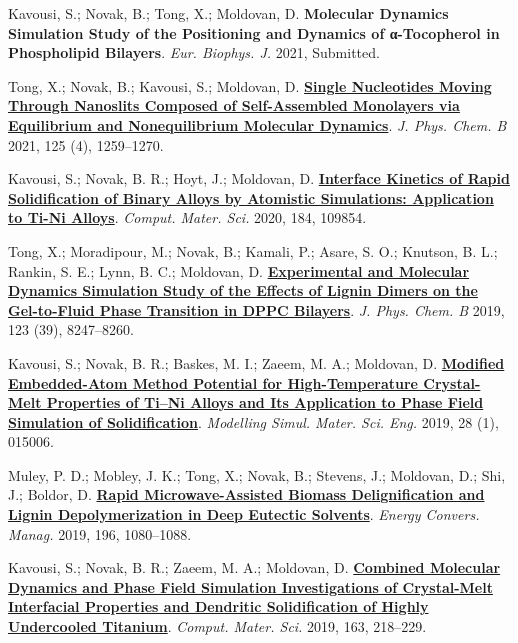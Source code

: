 \pagebreak


\begin{cventries}
  \cventry
    {} %
    {} %
    {} %
    {} %
    {
      \begin{cvitems} %
        \item {Kavousi, S.; Novak, B.; Tong, X.; Moldovan, D. \textbf{Molecular Dynamics Simulation Study of the Positioning and Dynamics of α-Tocopherol in Phospholipid Bilayers}. \textit{Eur. Biophys. J.} 2021, Submitted.}
        \item {Tong, X.; Novak, B.; Kavousi, S.; Moldovan, D. \href{https://doi.org/10.1021/acs.jpcb.0c07797}{\textbf{Single Nucleotides Moving Through Nanoslits Composed of Self-Assembled Monolayers via Equilibrium and Nonequilibrium Molecular Dynamics}}. \textit{J. Phys. Chem. B} 2021, 125 (4), 1259–1270.}
        \item {Kavousi, S.; Novak, B. R.; Hoyt, J.; Moldovan, D. \href{https://doi.org/10.1016/j.commatsci.2020.109854.}{\textbf{Interface Kinetics of Rapid Solidification of Binary Alloys by Atomistic Simulations: Application to Ti-Ni Alloys}}. \textit{Comput. Mater. Sci.} 2020, 184, 109854.}
        \item {Tong, X.; Moradipour, M.; Novak, B.; Kamali, P.; Asare, S. O.; Knutson, B. L.; Rankin, S. E.; Lynn, B. C.; Moldovan, D. \href{https://doi.org/10.1021/acs.jpcb.9b05525}{\textbf{Experimental and Molecular Dynamics Simulation Study of the Effects of Lignin Dimers on the Gel-to-Fluid Phase Transition in DPPC Bilayers}}. \textit{J. Phys. Chem. B} 2019, 123 (39), 8247–8260.}
        \item {Kavousi, S.; Novak, B. R.; Baskes, M. I.; Zaeem, M. A.; Moldovan, D. \href{https://doi.org/10.1088/1361-651X/ab580c}{\textbf{Modified Embedded-Atom Method Potential for High-Temperature Crystal-Melt Properties of Ti–Ni Alloys and Its Application to Phase Field Simulation of Solidification}}. \textit{Modelling Simul. Mater. Sci. Eng.} 2019, 28 (1), 015006.}
        \item {Muley, P. D.; Mobley, J. K.; Tong, X.; Novak, B.; Stevens, J.; Moldovan, D.; Shi, J.; Boldor, D. \href{https://doi.org/10.1016/j.enconman.2019.06.070}{\textbf{Rapid Microwave-Assisted Biomass Delignification and Lignin Depolymerization in Deep Eutectic Solvents}}. \textit{Energy Convers. Manag.} 2019, 196, 1080–1088.}
        \item {Kavousi, S.; Novak, B. R.; Zaeem, M. A.; Moldovan, D. \href{https://doi.org/10.1016/j.commatsci.2019.03.024}{\textbf{Combined Molecular Dynamics and Phase Field Simulation Investigations of Crystal-Melt Interfacial Properties and Dendritic Solidification of Highly Undercooled Titanium}}. \textit{Comput. Mater. Sci.} 2019, 163, 218–229.}

\end{cvitems}}
\end{cventries}
